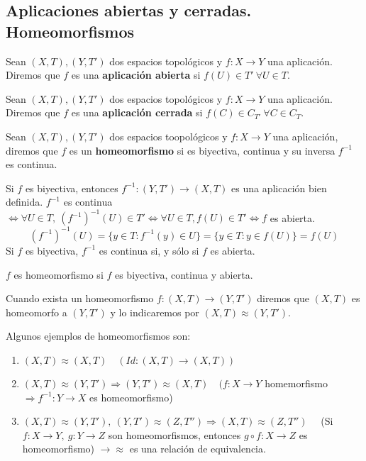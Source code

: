 \subsection{Aplicaciones abiertas y cerradas. Homeomorfismos}
\begin{ndef}
  Sean $(X,T), (Y,T')$ dos espacios topológicos y $f:X \to Y$ una aplicación. Diremos que $f$ es una \textbf{aplicación abierta} si $f(U) \in T'\ \forall U \in T$.
\end{ndef}
\begin{ndef}
  Sean $(X,T), (Y,T')$ dos espacios topológicos y $f:X \to Y$ una aplicación. Diremos que $f$ es una \textbf{aplicación cerrada} si $f(C) \in C_{T'}\ \forall C \in C_T$.
\end{ndef}
\begin{ndef}[Hoemomorfismo]
  Sean $(X,T),(Y,T')$ dos espacios toopológicos y $f:X \to Y$ una aplicación, diremos que $f$ es un \textbf{homeomorfismo} si es biyectiva, continua y su inversa $f^{-1}$ es continua.
\end{ndef}
Si $f$ es biyectiva, entonces $f^{-1}:(Y,T') \to (X,T)$ es una aplicación bien definida. $f^{-1}$ es continua $\Leftrightarrow \forall U \in T,\ (f^{-1})^{-1}(U) \in T' \Leftrightarrow \forall U \in T, f(U) \in T' \Leftrightarrow f$ es abierta.
\[(f^{-1})^{-1}(U) = \{y \in T : f^{-1}(y) \in U\} = \{y \in T : y \in f(U)\} = f(U)\]
Si $f$ es biyectiva, $f^{-1}$ es continua si, y sólo si $f$ es abierta.
\begin{note}
$f$ es homeomorfismo si $f$ es biyectiva, continua y abierta.
\end{note}
\begin{ndef}
  Cuando exista un homeomorfismo $f: (X,T) \to (Y,T')$ diremos que $(X,T)$ es homeomorfo a $(Y,T')$ y lo indicaremos por $(X,T) \approx (Y,T')$.
\end{ndef}
\begin{exmp}
  Algunos ejemplos de homeomorfismos son:
  \begin{enumerate}
      \item $(X,T) \approx (X,T) \quad (Id: (X,T) \to (X,T))$
      \item $(X,T) \approx (Y,T') \Rightarrow (Y,T') \approx (X,T) \quad (f:X \to Y$ homemorfismo $\Rightarrow f^{-1}: Y \to X$ es homeomorfismo)
      \item $(X,T) \approx (Y,T'),\ (Y,T') \approx (Z,T'') \Rightarrow (X,T) \approx (Z,T'') \quad$ (Si $f: X \to Y,\ g:Y \to Z$ son homeomorfismos, entonces $g \circ f:X \to Z$ es homeomorfismo) $\rightarrow \approx$ es una relación de equivalencia.
  \end{enumerate}
\end{exmp}

